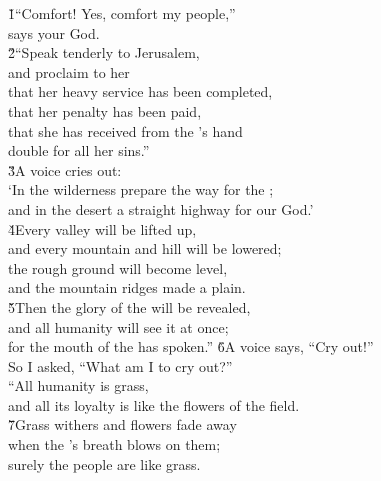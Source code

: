\begin{poetry}
\poeml {}
\v{1}``Comfort! Yes, comfort my people,'' \\
\poemll    says your God. \\
\poeml \v{2}``Speak tenderly to Jerusalem, \\
\poemll    and proclaim to her \\
\poeml that her heavy service has been completed, \\
\poemll    that her penalty has been paid, \\
\poeml that she has received from the 's hand \\
\poemll    double for all her sins.'' \\
\poeml \v{3}A voice cries out: \\
\poemll    `In the wilderness prepare the way for the ; \\
\poemlll       and in the desert a straight highway for our God.' \\
\poeml \v{4}Every valley will be lifted up, \\
\poemll    and every mountain and hill will be lowered; \\
\poeml the rough ground will become level, \\
\poemll    and the mountain ridges made a plain. \\
\poeml \v{5}Then the glory of the  will be revealed, \\
\poemll    and all humanity will see it at once; \\
\poemlll       for the mouth of the  has spoken.''
\poeml \v{6}A voice says, ``Cry out!'' \\
\poemll    So I asked, ``What am I to cry out?'' \\
\poeml ``All humanity is grass, \\
\poemll    and all its loyalty is like the flowers of the field. \\
\poeml \v{7}Grass withers and flowers fade away \\
\poemll    when the 's breath blows on them; \\
\poemlll       surely the people are like grass. \\

\end{poetry}
